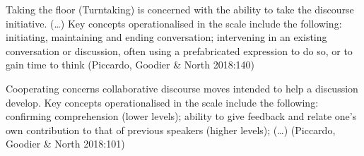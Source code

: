 \begin{styleQuote}
Taking the floor (Turntaking) is concerned with the ability to take the discourse initiative. (…) Key concepts operationalised in the scale include the following: initiating, maintaining and ending conversation; intervening in an existing conversation or discussion, often using a prefabricated expression to do so, or to gain time to think (Piccardo, Goodier \& North 2018:140) 
\end{styleQuote}

\begin{styleQuote}
Cooperating concerns collaborative discourse moves intended to help a discussion develop. Key concepts operationalised in the scale include the following: confirming comprehension (lower levels); ability to give feedback and relate one’s own contribution to that of previous speakers (higher levels); (…) (Piccardo, Goodier \& North 2018:101)
\end{styleQuote}


